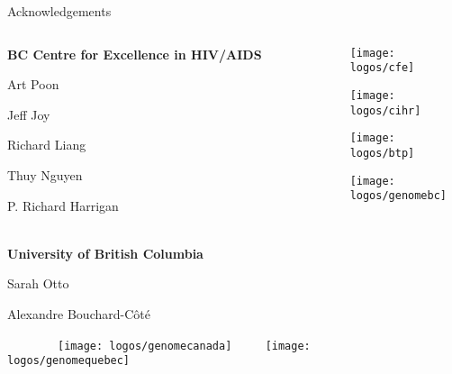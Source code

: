 \begin{frame}{Acknowledgements}
  \begin{columns}
    \begin{column}{0.6\textwidth}

      \textbf{BC Centre for Excellence in HIV/AIDS}

      Art Poon

      Jeff Joy

      Richard Liang

      Thuy Nguyen

      P. Richard Harrigan

      \hfill\\
      \textbf{University of British Columbia}

      Sarah Otto

      Alexandre Bouchard-C\^ot\'e

      \vfill
      \vspace{0.5cm}
      $\qquad\qquad$\texttt{[image: logos/genomecanada]}
      $\qquad$
      \texttt{[image: logos/genomequebec]}
    \end{column}
    \begin{column}{0.4\textwidth}
      \centering 

      \texttt{[image: logos/cfe]}
      \vspace{0.5cm}

      \texttt{[image: logos/cihr]}

      \vspace{0.5cm}
      \texttt{[image: logos/btp]}

      \vspace{0.5cm}
      \texttt{[image: logos/genomebc]}
    \end{column}
  \end{columns}
\end{frame}
